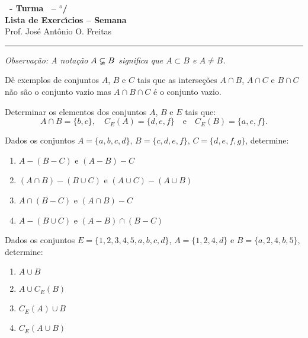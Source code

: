 \documentclass[12pt]{exam}
\begin{document}
    \begin{center}
        {\Large\bf \disciplina\ - Turma \turma\ -- \semestre$^{o}$/\ano} \\ \vspace{9pt} {\large\bf
            Lista de Exerc{\'\i}cios -- Semana \numerosemana}\\ \vspace{9pt} Prof. Jos{\'e} Ant{\^o}nio O. Freitas
    \end{center}
    \hrule

    \vspace{.6cm}

    \begin{center}
        \textit{Observa\c{c}\~ao: A nota\c{c}\~ao $A \varsubsetneq B$ significa que $A \subset B$ e $A \ne B$.}
    \end{center}

    \vspace{.3cm}

    \questao{} Dê exemplos de conjuntos $A$, $B$ e $C$ tais que as interseções $A \cap B$, $A \cap C$ e $B \cap C$ não são o conjunto vazio mas $A \cap B \cap C$ é o conjunto vazio.

    \vspace{.3cm}

    \questao{} Determinar os elementos dos conjuntos $A$, $B$ e $E$ tais que:
    \[
        A \cap B = \{b, c\}, \quad C_E(A) = \{d, e, f\} \quad \mbox{e}\quad C_E(B) = \{a          , e, f\}.
    \]

    \vspace{.3cm}

    \questao{} Dados os conjuntos $A = \{a, b, c, d\}$, $B = \{c, d, e, f\}$, $C = \{d,       e, f, g\}$, determine:
    \begin{enumerate}[label={\alph*})]
        \item $A - (B - C)$ e $(A - B) - C$

        \item $(A \cap B) - (B \cup C)$ e $(A \cup C) - (A \cup B)$

        \item $A \cap (B - C)$ e $(A \cap B) - C$

        \item $A - (B \cup C)$ e $(A - B) \cap (B - C)$
    \end{enumerate}

    \questao{} Dados os conjuntos $E = \{1,2,3,4,5,a,b,c,d\}$, $A = \{1,2,4,d\}$ e $B =        \{a,2,4,b,5\}$, determine:
    \begin{multicols}{2}
        \begin{enumerate}[label={\alph*})]
            \item $A \cup B$

            \item $A \cup C_E(B)$

            \item $C_E(A) \cup B$

            \item $C_E(A \cup B)$
        \end{enumerate}
    \end{multicols}
\end{document}
